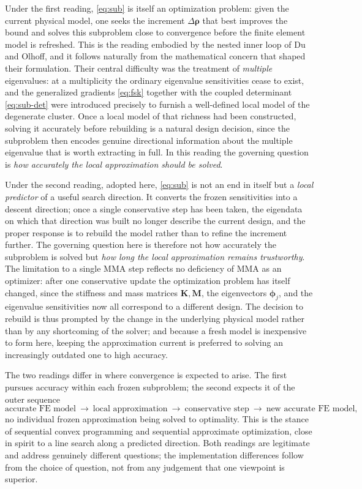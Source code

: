\documentclass[11pt]{article}
\newcommand{\rhov}{\bm{\rho}}
\newcommand{\Krho}{\mathbf{K}}
\newcommand{\Mrho}{\mathbf{M}}
\newcommand{\phiv}{\bm{\phi}}
\begin{document}
Under the first reading, \eqref{eq:sub} is itself an optimization problem:
given the current physical model, one seeks the increment $\Delta\rhov$
that best improves the bound and solves this subproblem close to
convergence before the finite element model is refreshed. This is the
reading embodied by the nested inner loop of Du and Olhoff, and it follows
naturally from the mathematical concern that shaped their formulation. Their
central difficulty was the treatment of \emph{multiple} eigenvalues: at a
multiplicity the ordinary eigenvalue sensitivities cease to exist, and the
generalized gradients \eqref{eq:fsk} together with the coupled determinant
\eqref{eq:sub-det} were introduced precisely to furnish a well-defined local
model of the degenerate cluster. Once a local model of that richness
had been constructed, solving it accurately before rebuilding is a natural
design decision, since the subproblem then encodes genuine directional
information about the multiple eigenvalue that is worth extracting in full.
In this reading the governing question is \emph{how accurately the local
approximation should be solved}.

Under the second reading, adopted here, \eqref{eq:sub} is not an end in
itself but a \emph{local predictor} of a useful search direction. It
converts the frozen sensitivities into a descent direction; once a single
conservative step has been taken, the eigendata on which that direction was
built no longer describe the current design, and the proper response is to
rebuild the model rather than to refine the increment further. The governing
question here is therefore not how accurately the subproblem is solved but
\emph{how long the local approximation remains trustworthy}. The limitation
to a single MMA step reflects no deficiency of MMA as an optimizer: after one
conservative update the optimization problem has itself changed, since the
stiffness and mass matrices $\Krho,\Mrho$, the eigenvectors $\phiv_j$, and
the eigenvalue sensitivities now all correspond to a different design. The
decision to rebuild is thus prompted by the change in the underlying
physical model rather than by any shortcoming of the solver; and because a
fresh model is inexpensive to form here, keeping the approximation current
is preferred to solving an increasingly outdated one to high accuracy.

The two readings differ in where convergence is expected to arise. The
first pursues accuracy within each frozen subproblem; the second expects it
of the outer sequence
\[
\text{accurate FE model}\ \to\ \text{local approximation}\ \to\
\text{conservative step}\ \to\ \text{new accurate FE model},
\]
no individual frozen approximation being solved to optimality. This is the
stance of sequential convex programming and sequential approximate
optimization, close in spirit to a line search along a predicted direction.
Both readings are legitimate and address genuinely different questions; the
implementation differences follow from the choice of question, not from any
judgement that one viewpoint is superior.
\end{document}
